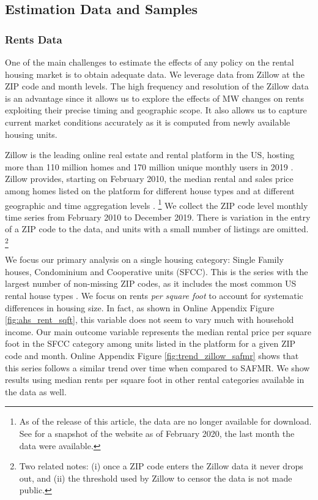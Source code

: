 \subsection{Estimation Data and Samples}

\subsubsection{Rents Data}
\label{sec:data_rents}

One of the main challenges to estimate the effects of any policy on the rental
housing market is to obtain adequate data.
We leverage data from Zillow at the ZIP code and month levels.
The high frequency and resolution of the Zillow data is an advantage since it 
allows us to explore the effects of MW changes on rents exploiting their precise
timing and geographic scope.
It also allows us to capture current market conditions accurately as it is 
computed from newly available housing units.

Zillow is the leading online real estate and rental platform in the US, hosting
more than 110 million homes and 170 million unique monthly users in 2019 
\parencite{ZillowFacts}.
Zillow provides, starting on February 2010, the median rental and sales price 
among homes listed on the platform for different house types and at different 
geographic and time aggregation levels \parencite{ZillowData}.%
\footnote{As of the release of this article, the data are no longer available 
	for download.
	See \textcite{ZillowDataArchive} for a snapshot of the website as of February 
	2020, the last month the data were available.}
We collect the ZIP code level monthly time series from February 2010 to 
December 2019.
There is variation in the entry of a ZIP code to the data, and units with a 
small number of listings are omitted.%
\footnote{Two related notes:
	(i) once a ZIP code enters the Zillow data it never drops out, and
	(ii) the threshold used by Zillow to censor the data is not made public.}

We focus our primary analysis on a single housing category:
Single Family houses, Condominium and Cooperative units (SFCC).
This is the series with the largest number of non-missing ZIP codes, as it 
includes the most common US rental house types \parencite{Fernald2020}.
We focus on rents \textit{per square foot} to account for systematic 
differences in housing size.
In fact, as shown in Online Appendix Figure \ref{fig:ahs_rent_sqft}, this 
variable does not seem to vary much with household income.
Our main outcome variable represents the median rental price per square foot in 
the SFCC category among units listed in the platform for a given ZIP code and 
month.
Online Appendix Figure \ref{fig:trend_zillow_safmr} shows that this series 
follows a similar trend over time when compared to SAFMR.
We show results using median rents per square foot in other rental categories 
available in the data as well.

